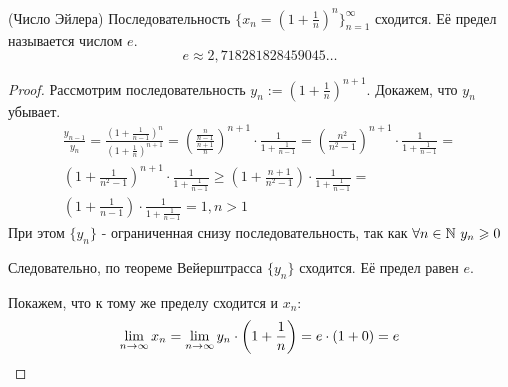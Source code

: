 \begin{theorem} (Число Эйлера)
	Последовательность $\{x_n = \left(1 + \frac{1}{n}\right)^n\}_{n = 1}^\infty$ сходится. Её предел называется числом $e$.
	$$
		e \approx 2,718281828459045\dots
	$$
\end{theorem}

\begin{proof}
	Рассмотрим последовательность $y_n := \left(1 + \frac{1}{n}\right)^{n + 1}$. Докажем, что $y_n$ убывает.
	\begin{multline*}
		\frac{y_{n - 1}}{y_n} = \frac{(1 + \frac{1}{n - 1})^n}{(1 + \frac{1}{n})^{n + 1}} = \left(\frac{\frac{n}{n - 1}}{\frac{n + 1}{n}}\right)^{n+1} \cdot \frac{1}{1 + \frac{1}{n - 1}} = \left(\frac{n^2}{n^2 - 1}\right)^{n+1} \cdot \frac{1}{1 + \frac{1}{n - 1}} = \\
		\left(1 + \frac{1}{n^2 - 1}\right)^{n+1} \cdot \frac{1}{1 + \frac{1}{n - 1}} \ge \left(1 + \frac{n + 1}{n^2 - 1}\right) \cdot \frac{1}{1 + \frac{1}{n - 1}} = \\
		\left(1 + \frac{1}{n - 1}\right) \cdot \frac{1}{1 + \frac{1}{n - 1}} = 1, n > 1
	\end{multline*}
	При этом $\{y_n\}$ - ограниченная снизу последовательность, так как $\forall n \in \mathbb{N}\ y_n \geqslant 0$
	
	Следовательно, по теореме Вейерштрасса $\{y_n\}$ сходится. Её предел равен $e$.
	
	Покажем, что к тому же пределу сходится и $x_n$:
	$$
		\lim\limits_{n \to \infty} x_n = \lim\limits_{n \to \infty} y_n \cdot \left(1 + \frac{1}{n}\right) = e \cdot (1 + 0) = e
	$$
\end{proof}